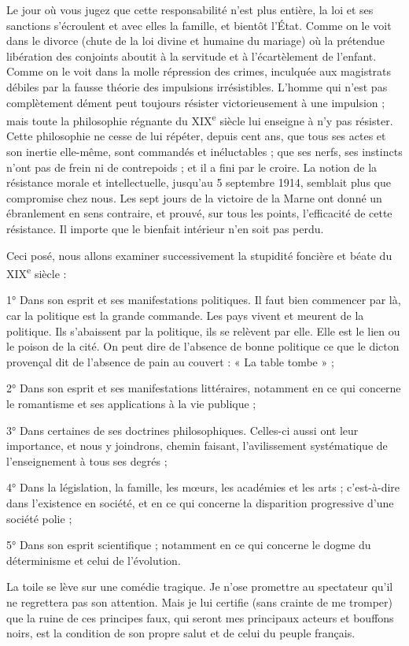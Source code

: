 \documentclass[french,twoside]{book} %
\newcommand\chapterclose{} %
\renewcommand\chapterclose{} %
\begin{document}
Le jour où vous jugez que cette responsabilité n’est plus entière, la loi et ses sanctions s’écroulent et avec elles la famille, et bientôt l’État. Comme on le voit dans le divorce (chute de la loi divine et humaine du mariage) où la prétendue libération des conjoints aboutit à la servitude et à l’écartèlement de l’enfant. Comme on le voit dans la molle répression des crimes, inculquée aux magistrats débiles par la fausse théorie des impulsions irrésistibles. L’homme qui n’est pas complètement dément peut toujours résister victorieusement à une impulsion ; mais toute la philosophie régnante du XIX\textsuperscript{e} siècle lui enseigne à n’y pas résister. Cette philosophie ne cesse de lui répéter, depuis cent ans, que tous ses actes et son inertie elle-même, sont commandés et inéluctables ; que ses nerfs, ses instincts n’ont pas de frein ni de contrepoids ; et il a fini par le croire. La notion de la résistance morale et intellectuelle, jusqu’au 5 septembre 1914, semblait plus que compromise chez nous. Les sept jours de la victoire de la Marne ont donné un ébranlement en sens contraire, et prouvé, sur tous les points, l’efficacité de cette résistance. Il importe que le bienfait intérieur n’en soit pas perdu.\par
Ceci posé, nous allons examiner successivement la stupidité foncière et béate du XIX\textsuperscript{e} siècle :\par
1° Dans son esprit et ses manifestations politiques. Il faut bien commencer par là, car la politique est la grande commande. Les pays vivent et meurent de la politique. Ils s’abaissent par la politique, ils se relèvent par elle. Elle est le lien ou le poison de la cité. On peut dire de l’absence de bonne politique ce que le dicton provençal dit de l’absence de pain au couvert : « La table tombe » ;\par
2° Dans son esprit et ses manifestations littéraires, notamment en ce qui concerne le romantisme et ses applications à la vie publique ;\par
3° Dans certaines de ses doctrines philosophiques. Celles-ci aussi ont leur importance, et nous y joindrons, chemin faisant, l’avilissement systématique de l’enseignement à tous ses degrés ;\par
4° Dans la législation, la famille, les mœurs, les académies et les arts ; c’est-à-dire dans l’existence en société, et en ce qui concerne la disparition progressive d’une société polie ;\par
5° Dans son esprit scientifique ; notamment en ce qui concerne le dogme du déterminisme et celui de l’évolution.\par
La toile se lève sur une comédie tragique. Je n’ose promettre au spectateur qu’il ne regrettera pas son attention. Mais je lui certifie (sans crainte de me tromper) que la ruine de ces principes faux, qui seront mes principaux acteurs et bouffons noirs, est la condition de son propre salut et de celui du peuple français.
\chapterclose
\end{document}
